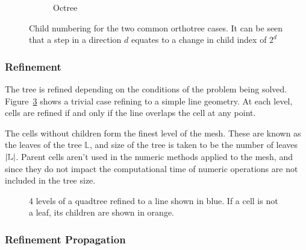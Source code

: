 \documentclass[twoside]{IIBproject}
\numberwithin{figure}{section}
\begin{document}
\begin{figure} [!htbp]
\begin{subfigure}[b]{.3\textwidth}
                    \caption{Octree}
                    \label{fig:childnum-3d}
                \end{subfigure}%
                \caption{Child numbering for the two common orthotree cases. It can be seen that a step in a direction $d$ equates to a change in child index of $2^d$}
                \label{fig:childnum}
            \end{figure}



        \subsubsection{Refinement} %
            \label{sec:orthotree-refine}

            The tree is refined depending on the conditions of the problem being solved. Figure~\ref{fig:layeredtree} shows a trivial case refining to a simple line geometry. At each level, cells are refined if and only if the line overlaps the cell at any point. 

            The cells without children form the finest level of the mesh. These are known as the leaves of the tree $\mathbb{L}$, and size of the tree is taken to be the number of leaves $\abs{\mathbb{L}}$. Parent cells aren't used in the numeric methods applied to the mesh, and since they do not impact the computational time of numeric operations are not included in the tree size. 

            \begin{figure} [htb]
                
                \caption{4 levels of a quadtree refined to a line shown in blue. If a cell is not a leaf, its children are shown in orange.}
                \label{fig:layeredtree}
            \end{figure}



        \subsubsection{Refinement Propagation} %
            \label{sec:orthotree-refprop}
\end{document}
